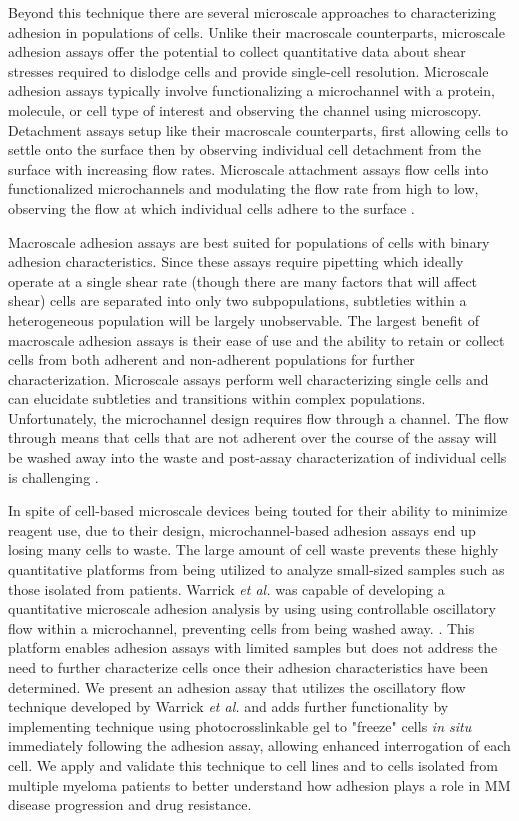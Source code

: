 Beyond this technique there are several microscale approaches to characterizing adhesion in populations of cells. Unlike their macroscale counterparts, microscale adhesion assays offer the potential to collect quantitative data about shear stresses required to dislodge cells and provide single-cell resolution. Microscale adhesion assays typically involve functionalizing a microchannel with a protein, molecule, or cell type of interest and observing the channel using microscopy. Detachment assays setup like their macroscale counterparts, first allowing cells to settle onto the surface then by observing individual cell detachment from the surface with increasing flow rates. Microscale attachment assays flow cells into functionalized microchannels and modulating the flow rate from high to low, observing the flow at which individual cells adhere to the surface \cite{Yang2013, Lamorte2012}.

Macroscale adhesion assays are best suited for populations of cells with binary adhesion characteristics. Since these assays require pipetting which ideally operate at a single shear rate (though there are many factors that will affect shear) cells are separated into only two subpopulations, subtleties within a heterogeneous population will be largely unobservable. The largest benefit of macroscale adhesion assays is their ease of use and the ability to retain or collect cells from both adherent and non-adherent populations for further characterization. Microscale assays perform well characterizing single cells and can elucidate subtleties and transitions within complex populations. Unfortunately, the microchannel design requires flow through a channel. The flow through means that cells that are not adherent over the course of the assay will be washed away into the waste and post-assay characterization of individual cells is challenging \cite{C2IB20036H, Andersson2003, ELPS200305627}. 

In spite of cell-based microscale devices being touted for their ability to minimize reagent use, due to their design, microchannel-based adhesion assays end up losing many cells to waste. The large amount of cell waste prevents these highly quantitative platforms from being utilized to analyze small-sized samples such as those isolated from patients. Warrick \textit{et al.} was capable of developing a quantitative microscale adhesion analysis by using using controllable oscillatory flow within a microchannel, preventing cells from being washed away. \cite{Warrick2013}. This platform enables adhesion assays with limited samples but does not address the need to further characterize cells once their adhesion characteristics have been determined. We present an adhesion assay that utilizes the oscillatory flow technique developed by Warrick \textit{et al.} and adds further functionality by implementing technique using photocrosslinkable gel to "freeze" cells \textit{in situ} immediately following the adhesion assay, allowing enhanced interrogation of each cell. We apply and validate this technique to cell lines and to cells isolated from multiple myeloma patients to better understand how adhesion plays a role in MM disease progression and drug resistance. 

